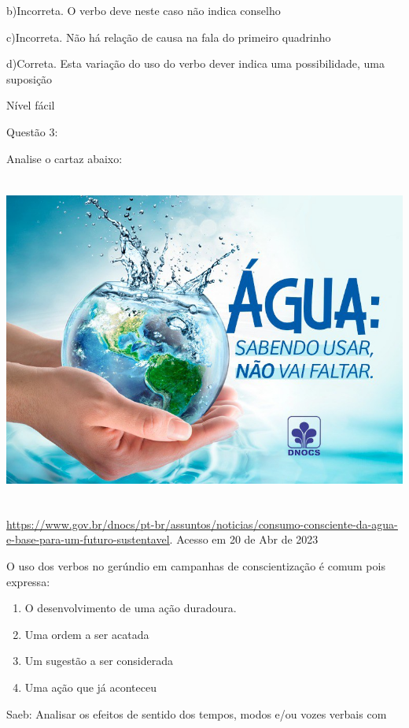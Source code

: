 {b)Incorreta. O verbo deve neste caso não indica conselho

c)Incorreta. Não há relação de causa na fala do primeiro quadrinho

d)Correta. Esta variação do uso do verbo dever indica uma possibilidade,
uma suposição

Nível fácil

Questão 3:

Analise o cartaz abaixo:

\includegraphics[width=5.90551in,height=4.29167in]{./imgSAEB_7_POR/media/image13.png}

\href{https://www.gov.br/dnocs/pt-br/assuntos/noticias/consumo-consciente-da-agua-e-base-para-um-futuro-sustentavel}{\uline{https://www.gov.br/dnocs/pt-br/assuntos/noticias/consumo-consciente-da-agua-e-base-para-um-futuro-sustentavel}}.
Acesso em 20 de Abr de 2023

O uso dos verbos no gerúndio em campanhas de conscientização é comum
pois expressa:

\begin{enumerate}
\def\labelenumi{\alph{enumi})}
\item
  O desenvolvimento de uma ação duradoura.
\item
  Uma ordem a ser acatada
\item
  Um sugestão a ser considerada
\item
  Uma ação que já aconteceu
\end{enumerate}

Saeb: Analisar os efeitos de sentido dos tempos, modos e/ou vozes
verbais com

}
